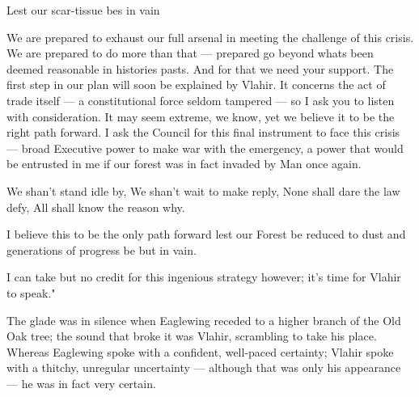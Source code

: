 Lest our scar-tissue bes in vain

We are prepared to exhaust our full arsenal in meeting the challenge of this crisis. We are prepared to do more than that — prepared go beyond whats been deemed reasonable in histories pasts. And for that we need your support.
The first step in our plan will soon be explained by Vlahir. It concerns the act of trade itself — a constitutional force seldom tampered — so I ask you to listen with consideration. It may seem extreme, we know, yet we believe it to be the right path forward. I ask the Council for this final instrument to face this crisis — broad Executive power to make war with the emergency, a power that would be entrusted in me if our forest was in fact invaded by Man once again. 

We shan't stand idle by,
We shan't wait to make reply,
None shall dare the law defy,
All shall know the reason why.

I believe this to be the only path forward lest our Forest be reduced to dust and generations of progress be but in vain.

I can take but no credit for this ingenious strategy however; it's time for Vlahir to speak."

The glade was in silence when Eaglewing receded to a higher branch of the Old Oak tree; the sound that broke it was Vlahir, scrambling to take his place. Whereas Eaglewing spoke with a confident, well-paced certainty; Vlahir spoke with a thitchy, unregular uncertainty — although that was only his appearance — he was in fact very certain.






